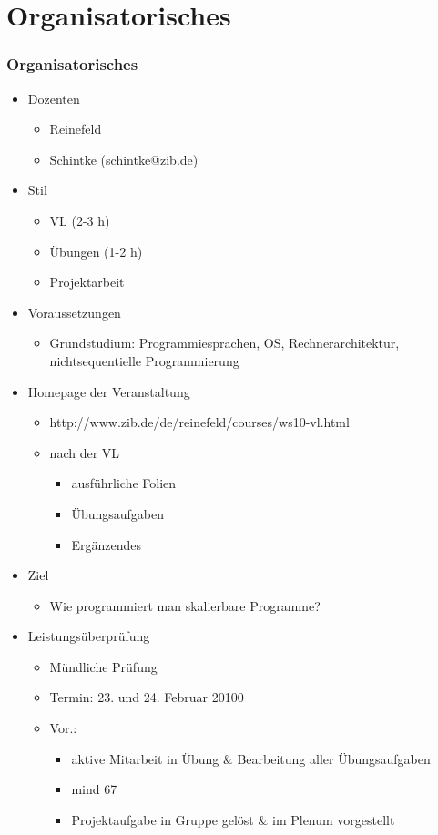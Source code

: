 \part{Organisatorisches}
\section{Organisatorisches}
\begin{itemize}
	\item Dozenten
		\begin{itemize}
			\item  Reinefeld
			\item Schintke (schintke@zib.de)
		\end{itemize}
	\item Stil
		\begin{itemize}
			\item VL (2-3 h)
			\item Übungen (1-2 h)
			\item Projektarbeit
		\end{itemize}
	\item Voraussetzungen
		\begin{itemize}
			\item Grundstudium: Programmiesprachen, OS, Rechnerarchitektur, nichtsequentielle Programmierung
		\end{itemize}
	\item Homepage der Veranstaltung
		\begin{itemize}
			\item http://www.zib.de/de/reinefeld/courses/ws10-vl.html
			\item nach der VL
				\begin{itemize}
					\item ausführliche Folien
					\item Übungsaufgaben
					\item Ergänzendes
				\end{itemize}
		\end{itemize}
	\item Ziel
		\begin{itemize}
			\item Wie programmiert man skalierbare Programme?
		\end{itemize}
	\item Leistungsüberprüfung
		\begin{itemize}
			\item Mündliche Prüfung
			\item Termin: 23. und 24. Februar 20100
			\item Vor.:
				\begin{itemize}
					\item aktive Mitarbeit in Übung \& Bearbeitung aller Übungsaufgaben
					\item mind 67%
					\item Projektaufgabe in Gruppe gelöst \& im Plenum vorgestellt
				\end{itemize}
		\end{itemize}
\end{itemize}

